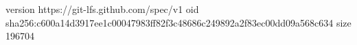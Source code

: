 version https://git-lfs.github.com/spec/v1
oid sha256:c600a14d3917ee1c00047983ff82f3c48686c249892a2f83ec00dd09a568c634
size 196704
